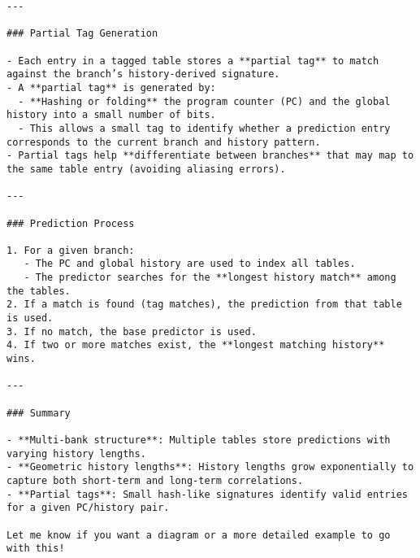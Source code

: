 \documentclass[sigconf, screen]{acmart}
\begin{document}
\begin{Verbatim}[fontsize=\tiny, breaklines=true]
---

### Partial Tag Generation

- Each entry in a tagged table stores a **partial tag** to match against the branch’s history-derived signature.
- A **partial tag** is generated by:
  - **Hashing or folding** the program counter (PC) and the global history into a small number of bits.
  - This allows a small tag to identify whether a prediction entry corresponds to the current branch and history pattern.
- Partial tags help **differentiate between branches** that may map to the same table entry (avoiding aliasing errors).

---

### Prediction Process

1. For a given branch:
   - The PC and global history are used to index all tables.
   - The predictor searches for the **longest history match** among the tables.
2. If a match is found (tag matches), the prediction from that table is used.
3. If no match, the base predictor is used.
4. If two or more matches exist, the **longest matching history** wins.

---

### Summary

- **Multi-bank structure**: Multiple tables store predictions with varying history lengths.
- **Geometric history lengths**: History lengths grow exponentially to capture both short-term and long-term correlations.
- **Partial tags**: Small hash-like signatures identify valid entries for a given PC/history pair.

Let me know if you want a diagram or a more detailed example to go with this!
\end{Verbatim}
\end{document}
